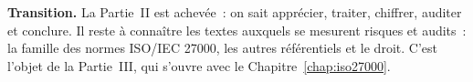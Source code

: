 \begin{boxinfo}
\textbf{Transition.} La Partie~II est achevée~: on sait apprécier,
traiter, chiffrer, auditer et conclure. Il reste à connaître les textes
auxquels se mesurent risques et audits~: la famille des normes ISO/IEC
27000, les autres référentiels et le droit. C'est l'objet de la
Partie~III, qui s'ouvre avec le Chapitre~\ref{chap:iso27000}.
\end{boxinfo}
